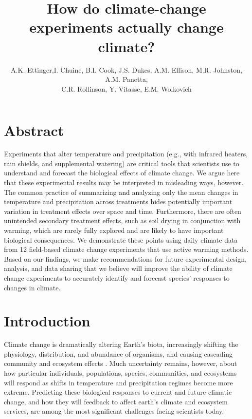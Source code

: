 \documentclass{article}
\begin{document}
 
\title{How do climate-change experiments actually change climate?} %
\author{A.K. Ettinger,I. Chuine, B.I. Cook, J.S. Dukes, A.M. Ellison, M.R. Johnston, A.M. Panetta,\\ C.R. Rollinson, Y. Vitasse, E.M. Wolkovich}
\maketitle  %

\section* {Abstract}
\par Experiments that alter temperature and precipitation (e.g., with infrared heaters, rain shields, and supplemental watering) are critical tools that scientists use to understand and forecast the biological effects of climate change. We argue here that these experimental results may be interpreted in misleading ways, however. The common practice of summarizing and analyzing only the mean changes in temperature and precipitation across treatments hides potentially important variation in treatment effects over space and time. Furthermore, there are often unintended secondary treatment effects, such as soil drying in conjunction with warming, which are rarely fully explored and are likely to have important biological consequences. We demonstrate these points using daily climate data from 12 field-based climate change experiments that use active warming methods. Based on our findings, we make recommendations for future experimental design, analysis, and data sharing that we believe will improve the ability of climate change experiments to accurately identify and forecast species' responses to changes in climate.
\section* {Introduction}
\par Climate change is dramatically altering Earth's biota, increasingly shifting the physiology, distribution, and abundance of organisms, and causing cascading community and ecosystem effects \citep{shukla1982,cox2000,thomas2004,parmesan2006,field2007,sheldon2011,urban2012}. Much uncertainty remains, however, about how particular individuals, populations, species, communities, and ecosystems will respond as shifts in temperature and precipitation regimes become more extreme. Predicting these biological responses to current and future climatic change, and how they will feedback to affect earth's climate and ecosystem services, are among the most significant challenges facing scientists today.
\end{document}
